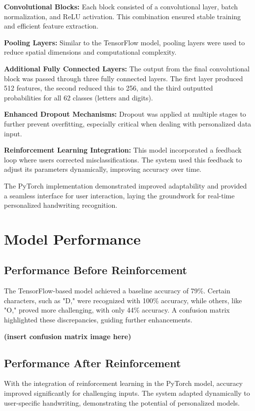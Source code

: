 \documentclass[journal]{IEEEtran}
\begin{document}
\textbf{Convolutional Blocks:} Each block consisted of a convolutional layer, batch normalization, and ReLU activation. This combination ensured stable training and efficient feature extraction.

\textbf{Pooling Layers:} Similar to the TensorFlow model, pooling layers were used to reduce spatial dimensions and computational complexity.

\textbf{Additional Fully Connected Layers:} The output from the final convolutional block was passed through three fully connected layers. The first layer produced 512 features, the second reduced this to 256, and the third outputted probabilities for all 62 classes (letters and digits).

\textbf{Enhanced Dropout Mechanisms:} Dropout was applied at multiple stages to further prevent overfitting, especially critical when dealing with personalized data input.

\textbf{Reinforcement Learning Integration:} This model incorporated a feedback loop where users corrected misclassifications. The system used this feedback to adjust its parameters dynamically, improving accuracy over time.

The PyTorch implementation demonstrated improved adaptability and provided a seamless interface for user interaction, laying the groundwork for real-time personalized handwriting recognition.

\section{Model Performance}
\subsection{Performance Before Reinforcement}
The TensorFlow-based model achieved a baseline accuracy of 79\%. Certain characters, such as "D," were recognized with 100\% accuracy, while others, like "O," proved more challenging, with only 44\% accuracy. A confusion matrix highlighted these discrepancies, guiding further enhancements.

\textbf{(insert confusion matrix image here)}

\subsection{Performance After Reinforcement}
With the integration of reinforcement learning in the PyTorch model, accuracy improved significantly for challenging inputs. The system adapted dynamically to user-specific handwriting, demonstrating the potential of personalized models.
\end{document}
